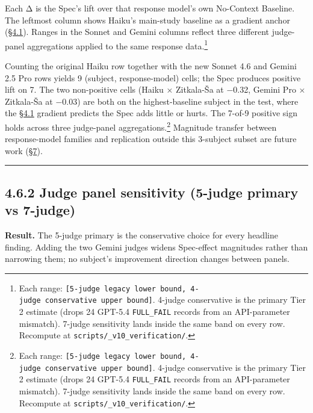 Each Δ is the Spec's lift over that response model's own No-Context
Baseline. The leftmost column shows Haiku's main-study baseline as a
gradient anchor (\hyperref[the-cross-subject-gradient-and-its-per-question-mechanism]{§4.1}). Ranges in the Sonnet and Gemini columns reflect
three different judge-panel aggregations applied to the same response
data.\footnote{Each range:
  \texttt{{[}5-judge\ legacy\ lower\ bound,\ 4-judge\ conservative\ upper\ bound{]}}.
  4-judge conservative is the primary Tier 2 estimate (drops 24 GPT-5.4
  \texttt{FULL\_FAIL} records from an API-parameter mismatch). 7-judge
  sensitivity lands inside the same band on every row. Recompute at
  \texttt{scripts/\_v10\_verification/}.}

Counting the original Haiku row together with the new Sonnet 4.6 and
Gemini 2.5 Pro rows yields 9 (subject, response-model) cells; the Spec
produces positive lift on 7. The two non-positive cells (Haiku ×
Zitkala-Ša at −0.32, Gemini Pro × Zitkala-Ša at −0.03) are both on the
highest-baseline subject in the test, where the \hyperref[the-cross-subject-gradient-and-its-per-question-mechanism]{§4.1} gradient predicts
the Spec adds little or hurts. The 7-of-9 positive sign holds across
three judge-panel aggregations.\footnote{Each range:
  \texttt{{[}5-judge\ legacy\ lower\ bound,\ 4-judge\ conservative\ upper\ bound{]}}.
  4-judge conservative is the primary Tier 2 estimate (drops 24 GPT-5.4
  \texttt{FULL\_FAIL} records from an API-parameter mismatch). 7-judge
  sensitivity lands inside the same band on every row. Recompute at
  \texttt{scripts/\_v10\_verification/}.} Magnitude transfer between
response-model families and replication outside this 3-subject subset
are future work (\hyperref[future-work]{§7}).

\begin{center}\rule{0.5\linewidth}{0.5pt}\end{center}

\hypertarget{judge-panel-sensitivity-5-judge-primary-vs-7-judge}{%
\subsection{4.6.2 Judge panel sensitivity (5-judge primary vs
7-judge)}\label{judge-panel-sensitivity-5-judge-primary-vs-7-judge}}

\textbf{Result.} The 5-judge primary is the conservative choice for
every headline finding. Adding the two Gemini judges widens Spec-effect
magnitudes rather than narrowing them; no subject's improvement
direction changes between panels.

